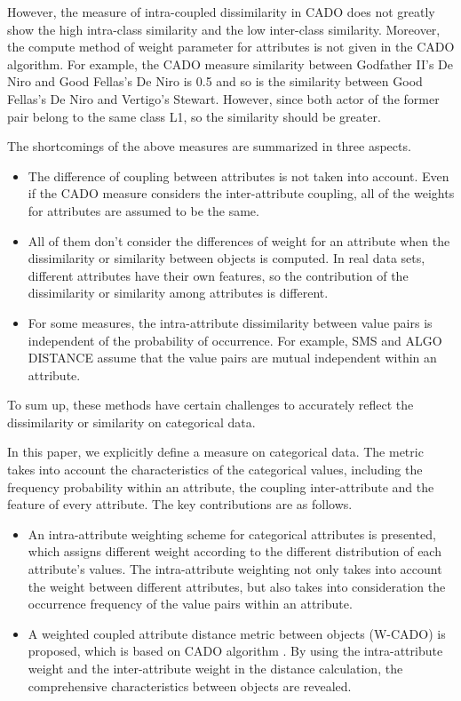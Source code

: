 \documentclass[review]{elsarticle}
\begin{document}
However, the measure of intra-coupled dissimilarity in CADO does not greatly show the high intra-class similarity and the low inter-class similarity. Moreover, the compute method of weight parameter for attributes is not given in the CADO algorithm. For example, the CADO measure similarity between Godfather II's De Niro and Good Fellas's De Niro is 0.5 and so is the similarity between Good Fellas's De Niro and Vertigo's Stewart. However, since both actor of the former pair belong to the same class L1, so the similarity should be greater.

The shortcomings of the above measures are summarized in three aspects.
\begin{itemize}
  \item The difference of coupling between attributes is not taken into account. Even if the CADO measure considers the inter-attribute coupling, all of the weights for attributes are assumed to be the same.
  \item All of them don't consider the differences of weight for an attribute when the dissimilarity or similarity between objects is computed. In real data sets, different attributes have their own features, so the contribution of the dissimilarity or similarity among attributes is different.
  \item For some measures, the intra-attribute dissimilarity between value pairs is independent of the probability of occurrence. For example, SMS and ALGO DISTANCE assume that the value pairs are mutual independent within an attribute.
 \end{itemize}

To sum up, these methods have certain challenges to accurately reflect the dissimilarity or similarity on categorical data.

In this paper, we explicitly define a measure on categorical data. The metric takes into account the characteristics of the categorical values, including the frequency probability within an attribute, the coupling inter-attribute and the feature of every attribute. The key contributions are as follows.
\begin{itemize}
  \item An intra-attribute weighting scheme for categorical attributes is presented, which assigns different weight according to the different distribution of each attribute's values. The intra-attribute weighting not only takes into account the weight between different attributes, but also takes into consideration the occurrence frequency of the value pairs within an attribute.

  \item A weighted coupled attribute distance metric between objects (W-CADO) is proposed, which is based on CADO algorithm \cite{Wang2015Coupled}. By using the intra-attribute weight and the inter-attribute weight \cite{Jia2014A} in the distance calculation, the comprehensive characteristics between objects are revealed.
\end{itemize}
\end{document}
